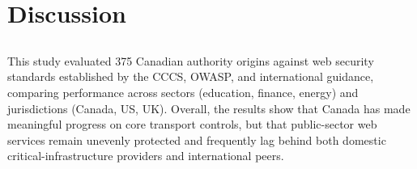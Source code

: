 \documentclass[pdflatex,sn-mathphys-num]{sn-jnl}
\numberwithin{equation}{section}
\theoremstyle{thmstyleone}
\theoremstyle{thmstyletwo}%
\theoremstyle{thmstylethree}%
\begin{document}



\section{Discussion}\label{sec:discussion}


\subsection{\color{red}{Summary of Results}}

This study evaluated 375 Canadian authority origins against web security standards established by the CCCS, 
OWASP, and international guidance, comparing performance across sectors (education, finance, energy) and 
jurisdictions (Canada, US, UK). Overall, the results show that Canada has made meaningful progress on core 
transport controls, but that public-sector web services remain unevenly protected and frequently lag behind 
both domestic critical-infrastructure providers and international peers.
\end{document}
